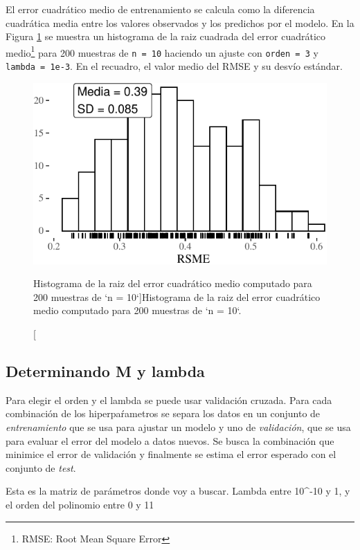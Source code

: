 \documentclass[]{tufte-handout}
\begin{document}
El error cuadrático medio de entrenamiento se calcula como la diferencia cuadrática media entre los valores observados y los predichos por el modelo. En la Figura \ref{fig:rmse-sd} se muestra un histograma de la raiz cuadrada del error cuadrático medio\footnote{RMSE: Root Mean Square Error} para 200 muestras de \texttt{n\ =\ 10} haciendo un ajuste con \texttt{orden\ =\ 3} y \texttt{lambda\ =\ 1e-3}. En el recuadro, el valor medio del RMSE y su desvío estándar.

\begin{figure}
\includegraphics{README_files/figure-latex/rmse-sd-1} \caption[Histograma de la raiz del error cuadrático medio computado para 200 muestras de `n = 10`]{Histograma de la raiz del error cuadrático medio computado para 200 muestras de `n = 10`.}\label{fig:rmse-sd}
\end{figure}

\hypertarget{determinando-m-y-lambda}{%
\subsection{Determinando M y lambda}\label{determinando-m-y-lambda}}

Para elegir el orden y el lambda se puede usar validación cruzada. Para cada combinación de los hiperpaŕametros se separa los datos en un conjunto de \emph{entrenamiento} que se usa para ajustar un modelo y uno de \emph{validación}, que se usa para evaluar el error del modelo a datos nuevos. Se busca la combinación que minimice el error de validación y finalmente se estima el error esperado con el conjunto de \emph{test}.

Esta es la matriz de parámetros donde voy a buscar. Lambda entre 10\^{}-10 y 1, y el orden del polinomio entre 0 y 11
\end{document}
